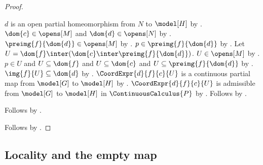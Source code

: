 \begin{proof}
\begin{subproof}
\begin{subproof}
                $d$ is an open partial homeomorphism from $N$ to $\model[H]$ by .
            $\dom{c}\in\opens[M]$ and $\dom{d}\in\opens[N]$ by .
            $\preimg{f}{\dom{d}}\in\opens[M]$ by .
            $p\in\preimg{f}{\dom{d}}$ by .
            Let $U=\dom{f}\inter(\dom{c}\inter\preimg{f}{\dom{d}})$.
            $U\in\opens[M]$ by .
            $p\in U$ and $U\subseteq\dom{f}$ and $U\subseteq\dom{c}$ and
                $U\subseteq\preimg{f}{\dom{d}}$ by .
            $\img{f}{U}\subseteq\dom{d}$ by
                .
            $\CoordExpr{d}{f}{c}{U}$ is a continuous partial map from $\model[G]$ to $\model[H]$ by
                .
            $\CoordExpr{d}{f}{c}{U}$ is admissible from $\model[G]$ to $\model[H]$ in $\ContinuousCalculus{P}$ by
                .
            Follows by .
        \end{subproof}
        Follows by .
    \end{subproof}
    Follows by \auto.
\end{proof}

\subsection{Locality and the empty map}

